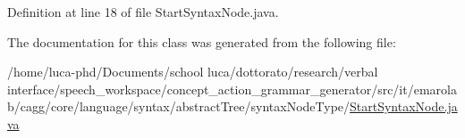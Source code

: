 Definition at line 18 of file Start\-Syntax\-Node.\-java.



The documentation for this class was generated from the following file\-:\begin{DoxyCompactItemize}
\item 
/home/luca-\/phd/\-Documents/school luca/dottorato/research/verbal interface/speech\-\_\-workspace/concept\-\_\-action\-\_\-grammar\-\_\-generator/src/it/emarolab/cagg/core/language/syntax/abstract\-Tree/syntax\-Node\-Type/\hyperlink{StartSyntaxNode_8java}{Start\-Syntax\-Node.\-java}\end{DoxyCompactItemize}
